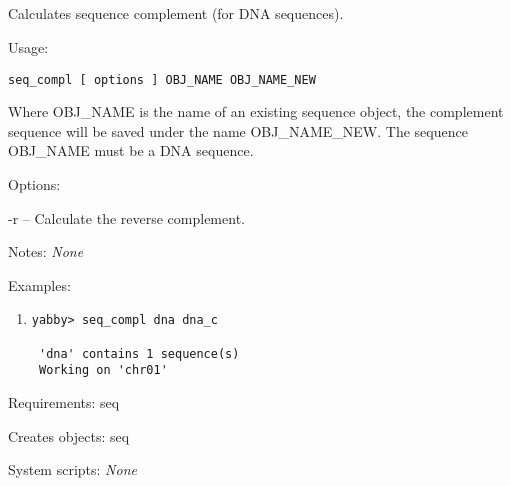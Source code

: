 

\subsection[seq\_compl]{  }



Calculates sequence complement (for DNA sequences).


\begin{description}


\item{Usage:}

{\tt seq\_compl [ options ] OBJ\_NAME OBJ\_NAME\_NEW}

 Where OBJ\_NAME is the name of an existing sequence object,
 the complement sequence will be saved under the name
 OBJ\_NAME\_NEW. The sequence OBJ\_NAME must be a DNA sequence.


\item{Options:}
\begin{description}
\item -r -- Calculate the reverse complement.
\end{description}


\item{Notes:} {\em None}


\item{Examples:}
\begin{enumerate}

\item
\begin{verbatim}
yabby> seq_compl dna dna_c

 'dna' contains 1 sequence(s)
 Working on 'chr01'

\end{verbatim}

\end{enumerate}


\item{Requirements:} seq


\item{Creates objects:} seq


\item{System scripts:} {\em None}

\end{description}


